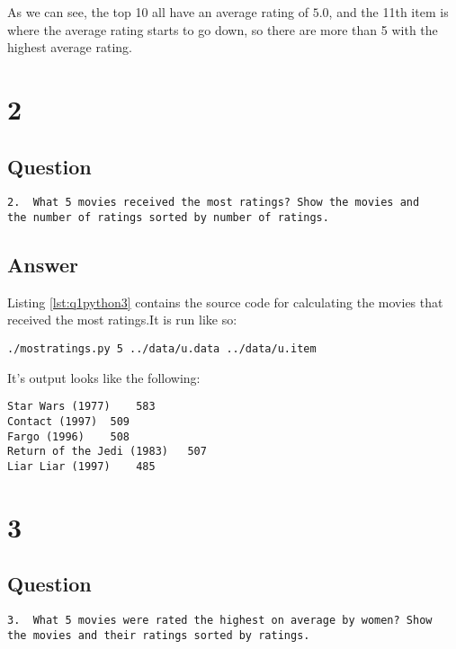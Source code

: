 \documentclass[letterpaper,11pt]{article}
\begin{document}
As we can see, the top 10 all have an average rating of $5.0$, and the 11th item is where the average rating starts to go down, so there are more than 5 with the highest average rating.

\newpage

\section*{2}

\subsection*{Question}

\begin{verbatim}
2.  What 5 movies received the most ratings? Show the movies and
the number of ratings sorted by number of ratings.
\end{verbatim}

\newpage
\subsection*{Answer}

Listing \ref{lst:q1python3} contains the source code for calculating the movies that received the most ratings.It is run like so:
\begin{lstlisting}[frame=single]
./mostratings.py 5 ../data/u.data ../data/u.item
\end{lstlisting}

It's output looks like the following:
\begin{lstlisting}[frame=single]
Star Wars (1977)	583
Contact (1997)	509
Fargo (1996)	508
Return of the Jedi (1983)	507
Liar Liar (1997)	485
\end{lstlisting}

\newpage

\section*{3}

\subsection*{Question}

\begin{verbatim}
3.  What 5 movies were rated the highest on average by women? Show
the movies and their ratings sorted by ratings.
\end{verbatim}
\end{document}
